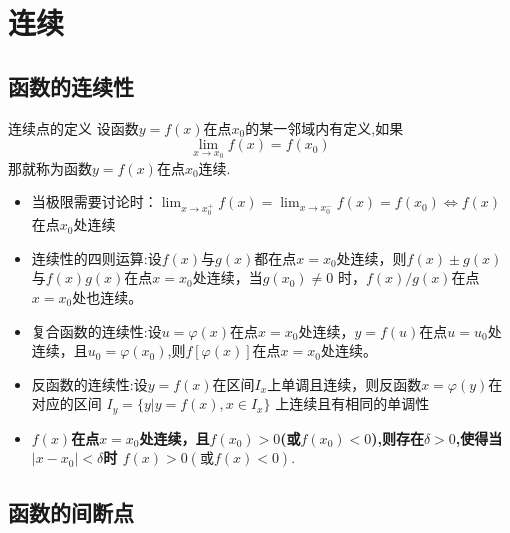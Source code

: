 \documentclass[12pt, a4paper, oneside, UTF8]{ctexbook}
\begin{document}
\begin{sloppypar}
    \else
    \fi
    \chapter{连续}
    \section{函数的连续性}
    \begin{defn}{连续点的定义}{}
        设函数$y=f(x)$在点$x_0$的某一邻域内有定义,如果
        $$
            \lim_{x\to x_0}f(x)=f(x_0)
        $$
        那就称为函数$y=f(x)$在点$x_0$连续.
    \end{defn}
    \begin{criterion}{}{}
        \begin{itemize}
            \item 当极限需要讨论时：$\lim_{x\to x_0^+}f\left(x\right)=\lim_{x\to x_0^-}f\left(x\right)=f\left(x_{0}\right)\Leftrightarrow f\left(x\right)$在点$x_{0}$处连续
            \item 连续性的四则运算:设$f(x)$与$g(x)$都在点$x=x_0$处连续，则$f(x)\pm g(x)$与$f(x)g(x)$在点$x=x_{0}$处连续，当$g(x_0)\neq0$ 时，$f(x)/g(x)$在点$x=x_{0}$处也连续。
            \item 复合函数的连续性:设$u=\varphi(x)$在点$x=x_0$处连续，$y=f(u)$在点$u=u_0$处连续，且$u_{0}=\varphi(x_{0})$,则$f\left[\varphi(x)\right]$在点$x=x_{0}$处连续。
            \item 反函数的连续性:设$y=f(x)$在区间$I_x$上单调且连续，则反函数$x=\varphi(y)$在对应的区间 $I_{y}=\{y|y=f(x),x\in I_{x}\}$ 上连续且有相同的单调性
            \item \textbf{$f(x)$在点$x=x_0$处连续，且$f(x_0)>0$(或$f(x_0)<0$),则存在$\delta>0$,使得当$|x-x_0|<\delta$时 $f\left(x\right)>0\left(\text{或}f\left(x\right)<0\right).$ }
        \end{itemize}
    \end{criterion}
    \section{函数的间断点}

\end{sloppypar}
\end{document}
